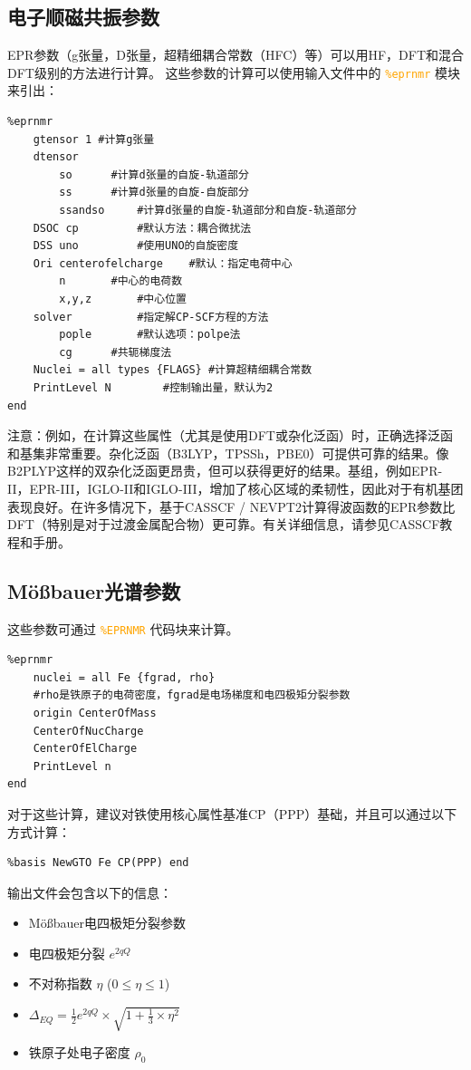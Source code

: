 \documentclass{ctexart}
\newcommand{\cmd}[1]{\textcolor{orange}{ \texttt{#1} }}
\begin{document}
	\subsection{电子顺磁共振参数} 
	EPR参数（g张量，D张量，超精细耦合常数（HFC）等）可以用HF，DFT和混合DFT级别的方法进行计算。
	这些参数的计算可以使用输入文件中的\cmd{\%eprnmr}模块来引出：
	\begin{lstlisting}
%eprnmr
	gtensor 1 #计算g张量
	dtensor 
		so		#计算d张量的自旋-轨道部分
		ss		#计算d张量的自旋-自旋部分 
		ssandso		#计算d张量的自旋-轨道部分和自旋-轨道部分
	DSOC cp 		#默认方法：耦合微扰法
	DSS uno 		#使用UNO的自旋密度
	Ori centerofelcharge	#默认：指定电荷中心
		n		#中心的电荷数
		x,y,z		#中心位置
	solver 			#指定解CP-SCF方程的方法 
		pople		#默认选项：polpe法
		cg		#共轭梯度法
	Nuclei = all types {FLAGS} #计算超精细耦合常数
	PrintLevel N    	#控制输出量，默认为2
end
	\end{lstlisting}
	
	注意：例如，在计算这些属性（尤其是使用DFT或杂化泛函）时，正确选择泛函和基集非常重要。杂化泛函（B3LYP，TPSSh，PBE0）可提供可靠的结果。像B2PLYP这样的双杂化泛函更昂贵，但可以获得更好的结果。基组，例如EPR-II，EPR-III，IGLO-II和IGLO-III，增加了核心区域的柔韧性，因此对于有机基团表现良好。在许多情况下，基于CASSCF / NEVPT2计算得波函数的EPR参数比DFT（特别是对于过渡金属配合物）更可靠。有关详细信息，请参见CASSCF教程和手册。
	
	\subsection{Mößbauer光谱参数} 
	
	这些参数可通过\cmd{\%EPRNMR}代码块来计算。
	\begin{lstlisting}
%eprnmr
	nuclei = all Fe {fgrad, rho}
	#rho是铁原子的电荷密度，fgrad是电场梯度和电四极矩分裂参数
	origin CenterOfMass
	CenterOfNucCharge
	CenterOfElCharge
	PrintLevel n 
end
	\end{lstlisting}
	
	对于这些计算，建议对铁使用核心属性基准CP（PPP）基础，并且可以通过以下方式计算：
	\begin{lstlisting}
%basis NewGTO Fe CP(PPP) end
	\end{lstlisting}
	输出文件会包含以下的信息：
	\begin{itemize}
	\item Mößbauer电四极矩分裂参数
	\item 电四极矩分裂 $e^{2qQ}$
	\item 不对称指数 $\eta$ ($0\leq\eta\leq1$) 
	\item $\Delta_{EQ}=\frac{1}{2}{e^{2qQ}}\times \sqrt{1+\frac{1}{3}\times\eta^{2}}$
	\item 铁原子处电子密度 $\rho_0$
	\end{itemize}
	
\end{document}
